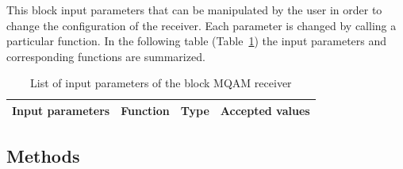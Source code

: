 This block input parameters that can be manipulated by the user in
order to change the configuration of the receiver. Each parameter is changed by
calling a
particular function. In the following table
(Table~\ref{tab:homodyneRx_params}) the input parameters and corresponding
functions are
summarized.
%
\begin{table}[h]
	\begin{center}
		\begin{tabular}{| m{} | m{} |  m{} | m{4cm} | }
			\hline
			\textbf{Input parameters} & \textbf{Function} & \textbf{Type} &
			\textbf{Accepted values} \\ \hline
		\end{tabular}
		\caption{List of input parameters of the block MQAM receiver}
		\label{tab:homodyneRx_params}
	\end{center}
\end{table}
%

\subsection*{Methods}

